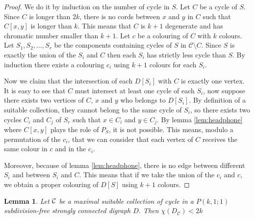 \documentclass[utf8,11pt]{article}
\theoremstyle{plain}
\newtheorem{lemma}[theorem]{Lemma}
\theoremstyle{definition}
\theoremstyle{remark}
\begin{document}
\begin{proof}
We do it by induction on the number of cycle in $S$. Let $C$ be a cycle of $S$. Since $C$ is longer than $2k$, there is no cords between $x$ and $y$ in $C$
such that $C[x,y]$ is longer than $k$. This means that $C$ is $k+1$ degenerate and has chromatic number smaller than $k +1$. Let $c$ be a colouring of $C$ with
$k$ colours. Let $S_1, S_2, \dots, S_r$ be the components containing cycles of $S$ in $\mathcal{C} \setminus{C}$. Since $S$ is exactly the union of the $S_i$ and $C$
then each $S_i$ has strictly less cycle than $S$. By induction there exists a colouring $c_i$ using $k+1$ colours for each $S_i$.
 
Now we claim that the intersection of each $D[S_i]$ with $C$ is exactly one vertex. It is easy to see that $C$ must intersect at least one cycle of each $S_i$, 
now suppose there exists two vertices of $C$, $x$ and $y$ who belongs to $D[S_i]$. By definition of a suitable collection, they cannot belong to the same cycle 
of $S_i$, so there exists two cycles $C_i$ and $C_j$ of $S_r$ such that $x \in C_i$ and $y \in C_j$. By lemma \ref{lem:headphone} where $C[x,y]$ plays the role
of $P_S$, it is not possible. This means, modulo a permutation of the $c_i$,
that we can consider that each vertex of $C$ receives the same colour in $c$ and in the $c_i$. 

Moreover, because of lemma \ref{lem:headphone}, there is no edge between different $S_i$ and between $S_i$ and $C$. This means that if we take the union of the 
$c_i$ and $c$, we obtain a proper colouring of $D[S]$ using $k+1$ colours. 
\end{proof}


\begin{lemma}\label{lem:reduce}
Let ${\cal C}$ be a maximal suitable collection of cycle in a $P(k,1;1)$ subdivision-free strongly connected digraph $D$. Then $\chi(D_{\mathcal{C}}) < 2k$
\end{lemma}
\end{document}

